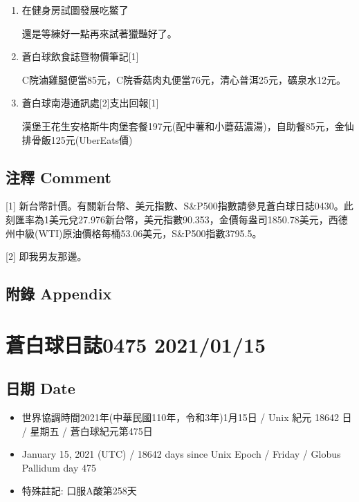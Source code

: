 \documentclass[
]{article}
\providecommand{\tightlist}{%
  \setlength{\itemsep}{0pt}\setlength{\parskip}{0pt}}
\begin{document}
\begin{enumerate}
\def\labelenumi{\arabic{enumi}.}
\item
  在健身房試圖發展吃鱉了

  還是等練好一點再來試著獵豔好了。
\item
  蒼白球飲食誌暨物價筆記{[}1{]}

  C院滷雞腿便當85元，C院香菇肉丸便當76元，清心普洱25元，礦泉水12元。
\item
  蒼白球南港通訊處{[}2{]}支出回報{[}1{]}

  漢堡王花生安格斯牛肉堡套餐197元(配中薯和小蘑菇濃湯)，自助餐85元，金仙排骨飯125元(UberEats價)
\end{enumerate}

\hypertarget{ux6ce8ux91cb-comment-13}{%
\subsection{注釋 Comment}\label{ux6ce8ux91cb-comment-13}}

{[}1{]}
新台幣計價。有關新台幣、美元指數、S\&P500指數請參見蒼白球日誌0430。此刻匯率為1美元兌27.976新台幣，美元指數90.353，金價每盎司1850.78美元，西德州中級(WTI)原油價格每桶53.06美元，S\&P500指數3795.5。

{[}2{]} 即我男友那邊。

\hypertarget{ux9644ux9304-appendix-13}{%
\subsection{附錄 Appendix}\label{ux9644ux9304-appendix-13}}

\hypertarget{ux84bcux767dux7403ux65e5ux8a8c0475-20210115}{%
\section{蒼白球日誌0475
2021/01/15}\label{ux84bcux767dux7403ux65e5ux8a8c0475-20210115}}

\hypertarget{ux65e5ux671f-date-14}{%
\subsection{日期 Date}\label{ux65e5ux671f-date-14}}

\begin{itemize}
\tightlist
\item
  世界協調時間2021年(中華民國110年，令和3年)1月15日 / Unix 紀元 18642 日
  / 星期五 / 蒼白球紀元第475日
\item
  January 15, 2021 (UTC) / 18642 days since Unix Epoch / Friday / Globus
  Pallidum day 475
\item
  特殊註記: 口服A酸第258天
\end{itemize}
\end{document}
